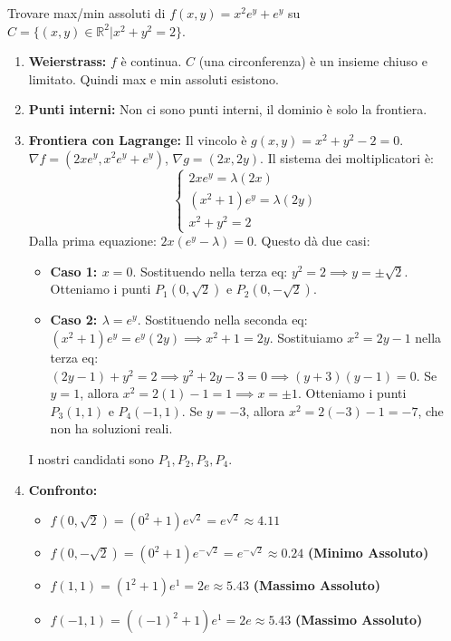 \documentclass[a4paper, 12pt]{article}
\newcommand{\R}{\mathbb{R}}
\begin{document}
\begin{esempio}
Trovare max/min assoluti di $f(x,y) = x^2e^y+e^y$ su $C=\{(x,y) \in \R^2 | x^2+y^2=2\}$. 
\begin{enumerate}
    \item \textbf{Weierstrass:} $f$ è continua. $C$ (una circonferenza) è un insieme chiuso e limitato.  Quindi max e min assoluti esistono. 
    \item \textbf{Punti interni:} Non ci sono punti interni, il dominio è solo la frontiera.
    \item \textbf{Frontiera con Lagrange:} Il vincolo è $g(x,y) = x^2+y^2-2=0$. 
    $\nabla f = (2xe^y, x^2e^y+e^y)$, $\nabla g = (2x, 2y)$. 
    Il sistema dei moltiplicatori è: 
    \[ \begin{cases} 2xe^y = \lambda (2x) \\ (x^2+1)e^y = \lambda (2y) \\ x^2+y^2=2 \end{cases} \]
    Dalla prima equazione: $2x(e^y - \lambda) = 0$. Questo dà due casi:
    \begin{itemize}
        \item \textbf{Caso 1: $x=0$}. Sostituendo nella terza eq: $y^2=2 \implies y=\pm\sqrt{2}$. Otteniamo i punti $P_1(0, \sqrt{2})$ e $P_2(0, -\sqrt{2})$.
        \item \textbf{Caso 2: $\lambda = e^y$}. Sostituendo nella seconda eq: $(x^2+1)e^y = e^y(2y) \implies x^2+1=2y$.
        Sostituiamo $x^2 = 2y-1$ nella terza eq: $(2y-1)+y^2=2 \implies y^2+2y-3=0 \implies (y+3)(y-1)=0$.
        Se $y=1$, allora $x^2=2(1)-1=1 \implies x=\pm 1$. Otteniamo i punti $P_3(1,1)$ e $P_4(-1,1)$.
        Se $y=-3$, allora $x^2=2(-3)-1=-7$, che non ha soluzioni reali.
    \end{itemize}
    I nostri candidati sono $P_1, P_2, P_3, P_4$.
    \item \textbf{Confronto:} 
    \begin{itemize}
        \item $f(0, \sqrt{2}) = (0^2+1)e^{\sqrt{2}} = e^{\sqrt{2}} \approx 4.11$
        \item $f(0, -\sqrt{2}) = (0^2+1)e^{-\sqrt{2}} = e^{-\sqrt{2}} \approx 0.24$ \textbf{(Minimo Assoluto)}
        \item $f(1, 1) = (1^2+1)e^1 = 2e \approx 5.43$ \textbf{(Massimo Assoluto)}
        \item $f(-1, 1) = ((-1)^2+1)e^1 = 2e \approx 5.43$ \textbf{(Massimo Assoluto)}
    \end{itemize}
\end{enumerate}
\end{esempio}
\end{document}
